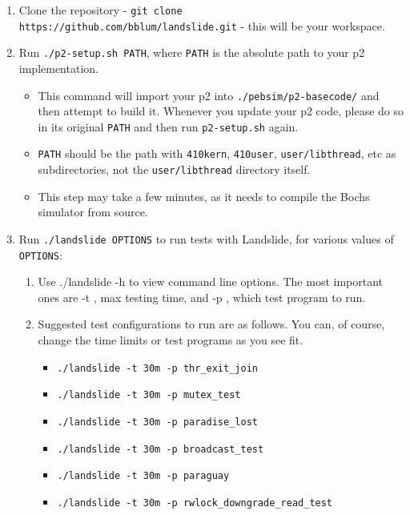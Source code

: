 \documentclass{article}
\begin{document}
\begin{enumerate}
	\item Clone the repository - {\tt git clone https://github.com/bblum/landslide.git} - this will be your workspace.
	\item Run {\tt ./p2-setup.sh PATH}, where {\tt PATH} is the absolute path to your p2 implementation.
		\begin{itemize}
			\item This command will import your p2 into {\tt ./pebsim/p2-basecode/} and then attempt to build it.
				Whenever you update your p2 code, please do so in its original {\tt PATH}
				and then run {\tt p2-setup.sh} again.
			\item {\tt PATH} should be the path with {\tt 410kern}, {\tt 410user}, {\tt user/libthread}, etc as subdirectories, not the {\tt user/libthread} directory itself.
			\item This step may take a few minutes, as it needs to compile the Bochs simulator from source.
		\end{itemize}
	\item Run {\tt ./landslide OPTIONS} to run tests with Landslide, for various values of {\tt OPTIONS}:
		\begin{enumerate}
			\item Use ./landslide -h to view command line options. The most important ones are -t , max testing
time, and -p , which test program to run.
			\item Suggested test configurations to run are as follows.
				You can, of course, change the time limits or test programs as you see fit.
				\begin{itemize}
					\item \texttt{./landslide -t 30m -p thr\_exit\_join}
					\item \texttt{./landslide -t 30m -p mutex\_test}
					\item \texttt{./landslide -t 30m -p paradise\_lost}
					\item \texttt{./landslide -t 30m -p broadcast\_test}
					\item \texttt{./landslide -t 30m -p paraguay}
					\item \texttt{./landslide -t 30m -p rwlock\_downgrade\_read\_test}
						\\

\end{itemize}
\end{enumerate}
\end{enumerate}
\end{document}

